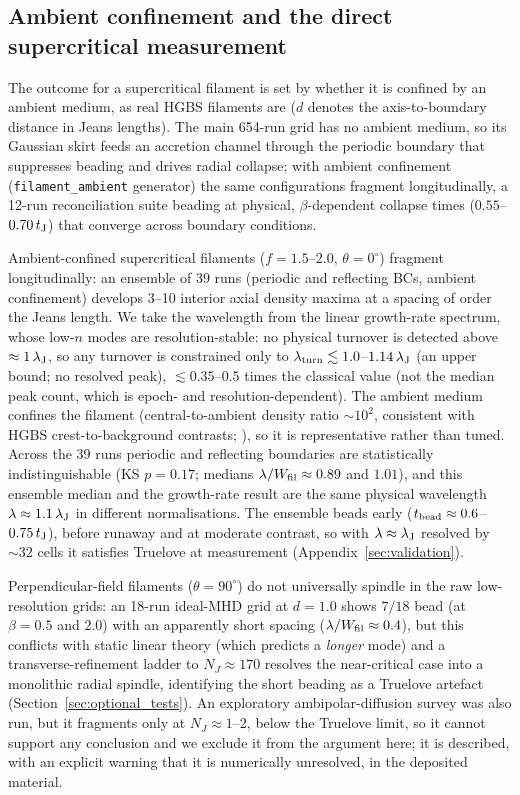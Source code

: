\documentclass[usenatbib,twoside,twocolumn]{mnras}
\begin{document}
\subsection{Ambient confinement and the direct supercritical measurement}
\label{sec:modecompetition}

The outcome for a supercritical filament is set by whether it is confined by an ambient medium, as real HGBS filaments are ($d$ denotes the axis-to-boundary distance in Jeans lengths). The main 654-run grid has no ambient medium, so its Gaussian skirt feeds an accretion channel through the periodic boundary that suppresses beading and drives radial collapse; with ambient confinement (\texttt{filament\_ambient} generator) the same configurations fragment longitudinally, a 12-run reconciliation suite beading at physical, $\beta$-dependent collapse times ($0.55$--$0.70\,t_{\rm J}$) that converge across boundary conditions.

Ambient-confined supercritical filaments ($f=1.5$--$2.0$, $\theta=0^\circ$) fragment longitudinally: an ensemble of 39 runs (periodic and reflecting BCs, ambient confinement) develops 3--10 interior axial density maxima at a spacing of order the Jeans length. We take the wavelength from the linear growth-rate spectrum, whose low-$n$ modes are resolution-stable: no physical turnover is detected above $\approx1\,\lambda_{\rm J}$, so any turnover is constrained only to $\lambda_{\rm turn}\lesssim1.0$--$1.14\,\lambda_{\rm J}$ (an upper bound; no resolved peak), $\lesssim0.35$--$0.5$ times the classical value (not the median peak count, which is epoch- and resolution-dependent). The ambient medium confines the filament (central-to-ambient density ratio $\sim10^2$, consistent with HGBS crest-to-background contrasts; \citealt{Arzoumanian2019}), so it is representative rather than tuned. Across the 39 runs periodic and reflecting boundaries are statistically indistinguishable (KS $p=0.17$; medians $\lambda/W_{\rm fil}\approx0.89$ and $1.01$), and this ensemble median and the growth-rate result are the same physical wavelength $\lambda\approx1.1\,\lambda_{\rm J}$ in different normalisations. The ensemble beads early ($t_{\rm bead}\approx0.6$--$0.75\,t_{\rm J}$), before runaway and at moderate contrast, so with $\lambda\approx\lambda_{\rm J}$ resolved by ${\sim}32$ cells it satisfies Truelove at measurement (Appendix~\ref{sec:validation}).

Perpendicular-field filaments ($\theta=90^\circ$) do not universally spindle in the raw low-resolution grids: an 18-run ideal-MHD grid at $d=1.0$ shows $7/18$ bead (at $\beta=0.5$ and $2.0$) with an apparently short spacing ($\lambda/W_{\rm fil}\approx0.4$), but this conflicts with static linear theory (which predicts a \emph{longer} mode) and a transverse-refinement ladder to $N_J\approx170$ resolves the near-critical case into a monolithic radial spindle, identifying the short beading as a Truelove artefact (Section~\ref{sec:optional_tests}). An exploratory ambipolar-diffusion survey was also run, but it fragments only at $N_J\approx1$--$2$, below the Truelove limit, so it cannot support any conclusion and we exclude it from the argument here; it is described, with an explicit warning that it is numerically unresolved, in the deposited material.
\end{document}
